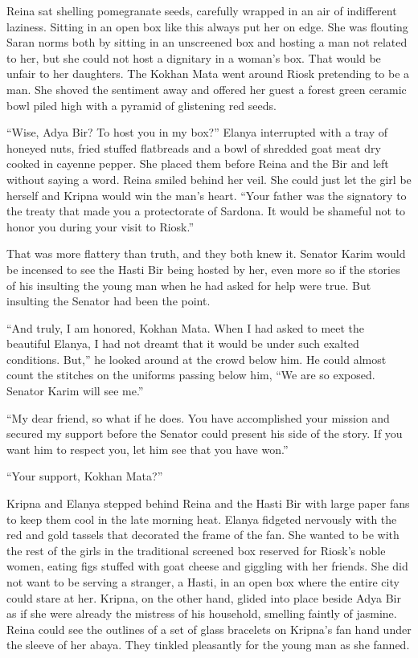 \documentclass{article}
\begin{document}
	Reina sat shelling pomegranate seeds, carefully wrapped in an air of indifferent laziness. Sitting in an open box like this always put her on edge. She was flouting Saran norms both by sitting in an unscreened box and hosting a man not related to her, but she could not host a dignitary in a woman’s box. That would be unfair to her daughters. The Kokhan Mata went around Riosk pretending to be a man. She shoved the sentiment away and offered her guest a forest green ceramic bowl piled high with a pyramid of glistening red seeds. 
	
	“Wise, Adya Bir? To host you in my box?” Elanya interrupted with a tray of honeyed nuts, fried stuffed flatbreads and a bowl of shredded goat meat dry cooked in cayenne pepper. She placed them before Reina and the Bir and left without saying a word. Reina smiled behind her veil. She could just let the girl be herself and Kripna would win the man’s heart. “Your father was the signatory to the treaty that made you a protectorate of Sardona. It would be shameful not to honor you during your visit to Riosk.”
	
	That was more flattery than truth, and they both knew it. Senator Karim would be incensed to see the Hasti Bir being hosted by her, even more so if the stories of his insulting the young man when he had asked for help were true. But insulting the Senator had been the point. 
	
	“And truly, I am honored, Kokhan Mata. When I had asked to meet the beautiful Elanya, I had not dreamt that it would be under such exalted conditions. But,” he looked around at the crowd below him. He could almost count the stitches on the uniforms passing below him, “We are so exposed. Senator Karim will see me.” 
	
	“My dear friend, so what if he does. You have accomplished your mission and secured my support before the Senator could present his side of the story. If you want him to respect you, let him see that you have won.”
	
	“Your support, Kokhan Mata?” 
	
	Kripna and Elanya stepped behind Reina and the Hasti Bir with large paper fans to keep them cool in the late morning heat. Elanya fidgeted nervously with the red and gold tassels that decorated the frame of the fan. She wanted to be with the rest of the girls in the traditional screened box reserved for Riosk’s noble women, eating figs stuffed with goat cheese and giggling with her friends. She did not want to be serving a stranger, a Hasti, in an open box where the entire city could stare at her. Kripna, on the other hand, glided into place beside Adya Bir as if she were already the mistress of his household, smelling faintly of jasmine. Reina could see the outlines of a set of glass bracelets on Kripna’s fan hand under the sleeve of her abaya. They tinkled pleasantly for the young man as she fanned.
	
\end{document}

